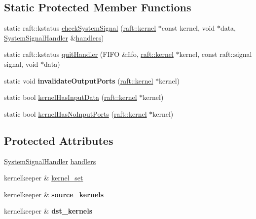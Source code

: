 \subsection*{Static Protected Member Functions}
\begin{DoxyCompactItemize}
\item 
static raft\+::kstatus \hyperlink{class_schedule_a85de3d48407aa378ccc86a4a4206b32a}{check\+System\+Signal} (\hyperlink{classraft_1_1kernel}{raft\+::kernel} $\ast$const kernel, void $\ast$data, \hyperlink{class_system_signal_handler}{System\+Signal\+Handler} \&\hyperlink{class_schedule_ad248e99611a87776fb411836cd46a603}{handlers})
\item 
static raft\+::kstatus \hyperlink{class_schedule_a5167d622689a34ea5f3a065304295521}{quit\+Handler} (F\+I\+F\+O \&fifo, \hyperlink{classraft_1_1kernel}{raft\+::kernel} $\ast$kernel, const raft\+::signal signal, void $\ast$data)
\item 
\hypertarget{class_schedule_a3bf10fd9419c58849d7be98336dc0aff}{}static void {\bfseries invalidate\+Output\+Ports} (\hyperlink{classraft_1_1kernel}{raft\+::kernel} $\ast$kernel)\label{class_schedule_a3bf10fd9419c58849d7be98336dc0aff}

\item 
static bool \hyperlink{class_schedule_ac23de3dd63554401fd0d8d23b60eecfa}{kernel\+Has\+Input\+Data} (\hyperlink{classraft_1_1kernel}{raft\+::kernel} $\ast$kernel)
\item 
static bool \hyperlink{class_schedule_a2e2035e0c0666054f8401ad2b3792854}{kernel\+Has\+No\+Input\+Ports} (\hyperlink{classraft_1_1kernel}{raft\+::kernel} $\ast$kernel)
\end{DoxyCompactItemize}
\subsection*{Protected Attributes}
\begin{DoxyCompactItemize}
\item 
\hyperlink{class_system_signal_handler}{System\+Signal\+Handler} \hyperlink{class_schedule_ad248e99611a87776fb411836cd46a603}{handlers}
\item 
kernelkeeper \& \hyperlink{class_schedule_a1a448b0d48e656f94db65a70cedd8eed}{kernel\+\_\+set}
\item 
\hypertarget{class_schedule_ad4c895eb77d8287a9a19215cced7af7b}{}kernelkeeper \& {\bfseries source\+\_\+kernels}\label{class_schedule_ad4c895eb77d8287a9a19215cced7af7b}

\item 
\hypertarget{class_schedule_aebf2c26334eae760032d82a016898043}{}kernelkeeper \& {\bfseries dst\+\_\+kernels}\label{class_schedule_aebf2c26334eae760032d82a016898043}

\end{DoxyCompactItemize}


